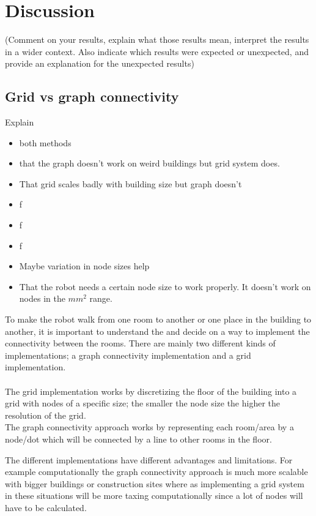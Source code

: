 \section*{Discussion}
(Comment on your results, explain what those results mean, interpret the results in a wider context. Also indicate which results were expected or unexpected, and provide an explanation for the unexpected results)


\subsection{Grid vs graph connectivity}
Explain
\begin{itemize}
    \item both methods 
    \item that the graph doesn't work on weird buildings but grid system does.
    \item That grid scales badly with building size but graph doesn't
    \item f
    \item f
    \item f
    \item Maybe variation in node sizes help
    \item That the robot needs a certain node size to work properly. It doesn't work on nodes in the $mm^2$ range.
\end{itemize}


To make the robot walk from one room to another or one place in the building to another, it is important to understand the and decide on a way to implement the connectivity between the rooms. There are mainly two different kinds of implementations; a graph connectivity implementation and a grid implementation.
\\\\
The grid implementation works by discretizing the floor of the building into a grid with nodes of a specific size; the smaller the node size the higher the resolution of the grid.
\\
The graph connectivity approach works by representing each room/area by a node/dot which will be connected by a line to other rooms in the floor.

The different implementations have different advantages and limitations. For example computationally the graph connectivity approach is much more scalable with bigger buildings or construction sites where as implementing a grid system in these situations will be more taxing computationally since a lot of nodes will have to be calculated. 

